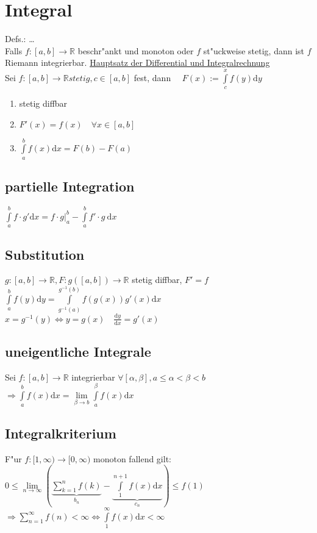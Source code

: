 \documentclass[10pt,a4paper^, twocolumn]{article}
\newcommand{\menge}{\mathbb} %
\renewcommand{\d}{\mathrm{d}} %
\begin{document}
\section{Integral}
Defs.:  \dots \\
Falls $f:[a,b] \rightarrow \menge{R}$ beschr"ankt und monoton oder $f$ st"uckweise stetig, dann ist $f$ Riemann integrierbar.
\underline{Hauptsatz der Differential und Integralrechnung} \\
	Sei $f:[a,b] \rightarrow \menge{R} stetig, c \in [a,b]$ fest, dann $\quad F(x) := \int\limits_c^x f(y) \d y$
	\begin{enumerate}
	\item stetig diffbar
	\item $F'(x) = f(x) \quad \forall x \in [a,b]$
	\item $\int\limits_a^b f(x) \d x = F(b) - F(a)$
	\end{enumerate}
\subsection{partielle Integration}
	$\int\limits_a^b f \cdot g' \d x = f \cdot g \big|_a^b - \int\limits_a^b f' \cdot g \ \d x$
\subsection{Substitution}
	$g:[a,b] \rightarrow \menge{R}, F: g([a,b]) \rightarrow \menge{R}$ stetig diffbar, $F' = f$ \\
	$\int\limits_a^b f(y) \d y = \int\limits_{g^{-1}(a)}^{g^{-1}(b)} f(g(x)) g'(x) \d x$ \\
	$x = g^{-1}(y) \Leftrightarrow y=g(x) \quad \frac{\d y}{\d x} = g'(x)$
\subsection{uneigentliche Integrale}
	Sei $f:[a,b] \rightarrow \menge{R}$ integrierbar $\forall [\alpha, \beta], a \leq \alpha < \beta < b$ \\
	$ \Rightarrow \int\limits_a^b f(x) \d x = \lim\limits_{\beta \to b} \int\limits_a^\beta f(x) \d x$
\subsection{Integralkriterium}
	F"ur $f: [1,\infty) \to [0, \infty )$ monoton fallend gilt: \\
	$0 \leq \lim\limits_{n \to \infty} ( \underbrace{\sum\limits_{k=1}^n f(k)}_{b_n} - \underbrace{\int\limits_1^{n+1} f(x) \d x}_{c_n} ) \leq f(1)$ \\
	$\Rightarrow \sum\limits_{n=1}^\infty f(n) < \infty \Leftrightarrow \int\limits_1^\infty f(x) \d x < \infty$
\end{document}
